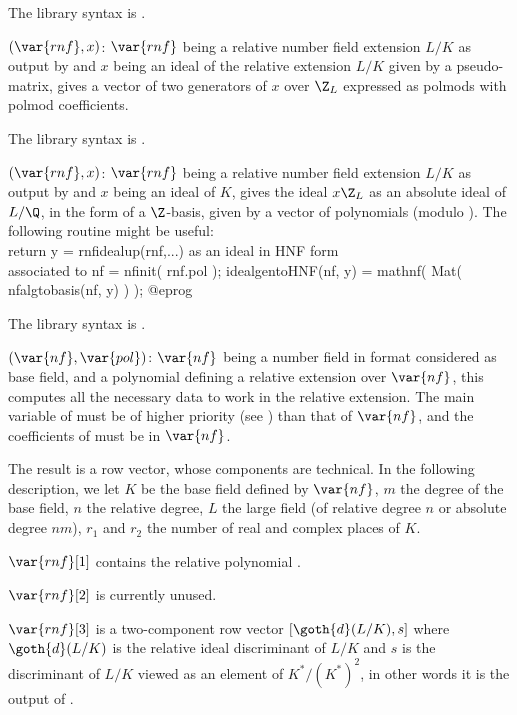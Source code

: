 The library syntax is .

$(\var{rnf},x)$: \label{se:rnfidealtwoelt}$\var{rnf}$ being a relative
number field extension $L/K$ as output by  and $x$ being an
ideal of the relative extension $L/K$ given by a pseudo-matrix, gives a
vector of two generators of $x$ over $\Z_L$ expressed as polmods with polmod
coefficients.

The library syntax is .

$(\var{rnf},x)$: \label{se:rnfidealup}$\var{rnf}$ being a relative number
field extension $L/K$ as output by  and $x$ being an ideal of
$K$, gives the ideal $x\Z_L$ as an absolute ideal of $L/\Q$, in the form of a
$\Z$-basis, given by a vector of polynomials (modulo ).
The following routine might be useful:
\bprog
\\ return y = rnfidealup(rnf,...) as an ideal in HNF form
\\ associated to nf = nfinit( rnf.pol );
idealgentoHNF(nf, y) = mathnf( Mat( nfalgtobasis(nf, y) ) );
@eprog

The library syntax is .

$(\var{nf},\var{pol})$: \label{se:rnfinit}$\var{nf}$ being a number field in 
format considered as base field, and  a polynomial defining a relative
extension over $\var{nf}$, this computes all the necessary data to work in the
relative extension. The main variable of  must be of higher priority
(see ) than that of $\var{nf}$, and the coefficients of
 must be in $\var{nf}$.

The result is a row vector, whose components are technical. In the following
description, we let $K$ be the base field defined by $\var{nf}$, $m$ the
degree of the base field, $n$ the relative degree, $L$ the large field (of
relative degree $n$ or absolute degree $nm$), $r_1$ and $r_2$ the number of
real and complex places of $K$.

$\var{rnf}[1]$ contains the relative polynomial .

$\var{rnf}[2]$ is currently unused.

$\var{rnf}[3]$ is a two-component row vector $[\goth{d}(L/K),s]$ where
$\goth{d}(L/K)$ is the relative ideal discriminant of $L/K$ and $s$ is the
discriminant of $L/K$ viewed as an element of $K^*/(K^*)^2$, in other words
it is the output of .

